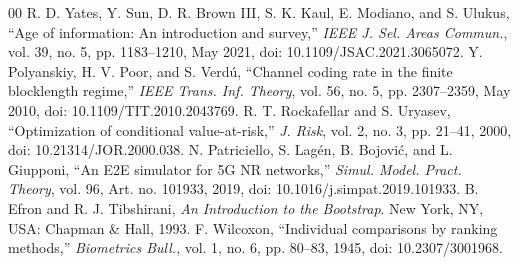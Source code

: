 \documentclass[conference]{IEEEtran}
\begin{document}
\begin{thebibliography}{00}
 R. D. Yates, Y. Sun, D. R. Brown III, S. K. Kaul, E. Modiano, and S. Ulukus, ``Age of information: An introduction and survey,'' \emph{IEEE J. Sel. Areas Commun.}, vol. 39, no. 5, pp. 1183--1210, May 2021, doi: 10.1109/JSAC.2021.3065072.
 Y. Polyanskiy, H. V. Poor, and S. Verd\'u, ``Channel coding rate in the finite blocklength regime,'' \emph{IEEE Trans. Inf. Theory}, vol. 56, no. 5, pp. 2307--2359, May 2010, doi: 10.1109/TIT.2010.2043769.
 R. T. Rockafellar and S. Uryasev, ``Optimization of conditional value-at-risk,'' \emph{J. Risk}, vol. 2, no. 3, pp. 21--41, 2000, doi: 10.21314/JOR.2000.038.
 N. Patriciello, S. Lag\'en, B. Bojovi\'c, and L. Giupponi, ``An E2E simulator for 5G NR networks,'' \emph{Simul. Model. Pract. Theory}, vol. 96, Art. no. 101933, 2019, doi: 10.1016/j.simpat.2019.101933.
 B. Efron and R. J. Tibshirani, \emph{An Introduction to the Bootstrap}. New York, NY, USA: Chapman \& Hall, 1993.
 F. Wilcoxon, ``Individual comparisons by ranking methods,'' \emph{Biometrics Bull.}, vol. 1, no. 6, pp. 80--83, 1945, doi: 10.2307/3001968.
\end{thebibliography}
\end{document}
